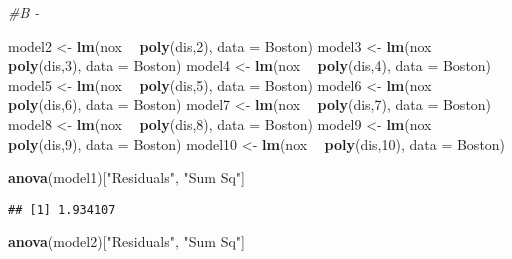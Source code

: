 \documentclass[
]{article}
\newenvironment{Shaded}{\begin{snugshade}}{\end{snugshade}}
\newcommand{\CommentTok}[1]{\textcolor[rgb]{0.56,0.35,0.01}{\textit{#1}}}
\newcommand{\DataTypeTok}[1]{\textcolor[rgb]{0.13,0.29,0.53}{#1}}
\newcommand{\DecValTok}[1]{\textcolor[rgb]{0.00,0.00,0.81}{#1}}
\newcommand{\KeywordTok}[1]{\textcolor[rgb]{0.13,0.29,0.53}{\textbf{#1}}}
\newcommand{\NormalTok}[1]{#1}
\newcommand{\OperatorTok}[1]{\textcolor[rgb]{0.81,0.36,0.00}{\textbf{#1}}}
\newcommand{\StringTok}[1]{\textcolor[rgb]{0.31,0.60,0.02}{#1}}
\begin{document}
\begin{Shaded}
\begin{Highlighting}[]
\CommentTok{#B - }

\NormalTok{model2 <-}\StringTok{ }\KeywordTok{lm}\NormalTok{(nox }\OperatorTok{~}\StringTok{ }\KeywordTok{poly}\NormalTok{(dis,}\DecValTok{2}\NormalTok{), }\DataTypeTok{data =}\NormalTok{ Boston)}
\NormalTok{model3 <-}\StringTok{ }\KeywordTok{lm}\NormalTok{(nox }\OperatorTok{~}\StringTok{ }\KeywordTok{poly}\NormalTok{(dis,}\DecValTok{3}\NormalTok{), }\DataTypeTok{data =}\NormalTok{ Boston)}
\NormalTok{model4 <-}\StringTok{ }\KeywordTok{lm}\NormalTok{(nox }\OperatorTok{~}\StringTok{ }\KeywordTok{poly}\NormalTok{(dis,}\DecValTok{4}\NormalTok{), }\DataTypeTok{data =}\NormalTok{ Boston)}
\NormalTok{model5 <-}\StringTok{ }\KeywordTok{lm}\NormalTok{(nox }\OperatorTok{~}\StringTok{ }\KeywordTok{poly}\NormalTok{(dis,}\DecValTok{5}\NormalTok{), }\DataTypeTok{data =}\NormalTok{ Boston)}
\NormalTok{model6 <-}\StringTok{ }\KeywordTok{lm}\NormalTok{(nox }\OperatorTok{~}\StringTok{ }\KeywordTok{poly}\NormalTok{(dis,}\DecValTok{6}\NormalTok{), }\DataTypeTok{data =}\NormalTok{ Boston)}
\NormalTok{model7 <-}\StringTok{ }\KeywordTok{lm}\NormalTok{(nox }\OperatorTok{~}\StringTok{ }\KeywordTok{poly}\NormalTok{(dis,}\DecValTok{7}\NormalTok{), }\DataTypeTok{data =}\NormalTok{ Boston)}
\NormalTok{model8 <-}\StringTok{ }\KeywordTok{lm}\NormalTok{(nox }\OperatorTok{~}\StringTok{ }\KeywordTok{poly}\NormalTok{(dis,}\DecValTok{8}\NormalTok{), }\DataTypeTok{data =}\NormalTok{ Boston)}
\NormalTok{model9 <-}\StringTok{ }\KeywordTok{lm}\NormalTok{(nox }\OperatorTok{~}\StringTok{ }\KeywordTok{poly}\NormalTok{(dis,}\DecValTok{9}\NormalTok{), }\DataTypeTok{data =}\NormalTok{ Boston)}
\NormalTok{model10 <-}\StringTok{ }\KeywordTok{lm}\NormalTok{(nox }\OperatorTok{~}\StringTok{ }\KeywordTok{poly}\NormalTok{(dis,}\DecValTok{10}\NormalTok{), }\DataTypeTok{data =}\NormalTok{ Boston)}

\KeywordTok{anova}\NormalTok{(model1)[}\StringTok{"Residuals"}\NormalTok{, }\StringTok{"Sum Sq"}\NormalTok{]}
\end{Highlighting}
\end{Shaded}

\begin{verbatim}
## [1] 1.934107
\end{verbatim}

\begin{Shaded}
\begin{Highlighting}[]
\KeywordTok{anova}\NormalTok{(model2)[}\StringTok{"Residuals"}\NormalTok{, }\StringTok{"Sum Sq"}\NormalTok{]}
\end{Highlighting}
\end{Shaded}
\end{document}
